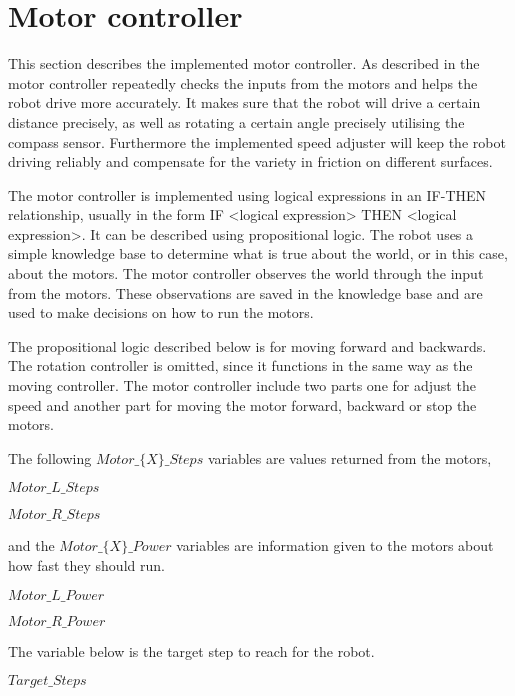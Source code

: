 \section{Motor controller} \label{sec:motor-controller-imp} 
This section describes the implemented motor controller. As described in  the motor controller repeatedly checks the inputs from the motors and helps the robot drive more accurately. It makes sure that the robot will drive a certain distance precisely, as well as rotating a certain angle precisely utilising the compass sensor. Furthermore the implemented speed adjuster will keep the robot driving reliably and compensate for the variety in friction on different surfaces.

The motor controller is implemented using logical expressions in an IF-THEN relationship, usually in the form IF <logical expression> THEN <logical expression>. It can be described using propositional logic. The robot uses a simple knowledge base to determine what is true about the world, or in this case, about the motors. The motor controller observes the world through the input from the motors. These observations are saved in the knowledge base and are used to make decisions on how to run the motors.

The propositional logic described below is for moving forward and backwards. The rotation controller is omitted, since it functions in the same way as the moving controller. The motor controller include two parts one for adjust the speed and another part for moving the motor forward, backward or stop the motors. 

The following $Motor\_\{X\}\_Steps$ variables are values returned from the motors,

\hspace{3mm} $Motor\_L\_Steps$

\hspace{3mm} $Motor\_R\_Steps$

and the $Motor\_\{X\}\_Power$ variables are information given to the motors about how fast they should run.

\hspace{3mm} $Motor\_L\_Power$

\hspace{3mm} $Motor\_R\_Power$

The variable below is the target step to reach for the robot. 

\hspace{3mm} $Target\_Steps$

